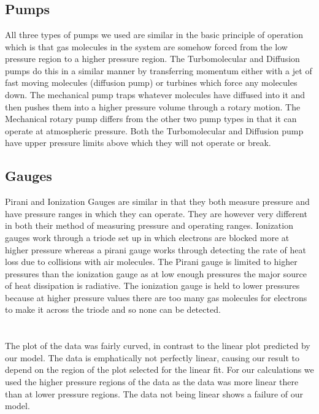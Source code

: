 \documentclass[12pt,a4paper]{article}
\begin{document}
\section{}
\subsection*{Pumps}
All three types of pumps we used are similar in the basic principle of operation which is that gas molecules in the system are somehow forced from the low pressure region to a higher pressure region. The Turbomolecular and Diffusion pumps do this in a similar manner by transferring momentum either with a jet of fast moving molecules (diffusion pump) or turbines which force any molecules down. The mechanical pump traps whatever molecules have diffused into it and then pushes them into a higher pressure volume through a rotary motion. The Mechanical rotary pump differs from the other two pump types in that it can operate at atmospheric pressure. Both the Turbomolecular and Diffusion pump have upper pressure limits above which they will not operate or break.
\subsection*{Gauges}
Pirani and Ionization Gauges are similar in that they both measure pressure and have pressure ranges in which they can operate. They are however very different in both their method of measuring pressure and operating ranges. Ionization gauges work through a triode set up in which electrons are blocked more at higher pressure whereas a pirani gauge works through detecting the rate of heat loss due to collisions with air molecules. The Pirani gauge is limited to higher pressures than the ionization gauge as at low enough pressures the major source of heat dissipation is radiative. The ionization gauge is held to lower pressures because at higher pressure values there are too many gas molecules for electrons to make it across the triode and so none can be detected.
\section{}
The plot of the data was fairly curved, in contrast to the linear plot predicted by our model. The data is emphatically not perfectly linear, causing our result to depend on the region of the plot selected for the linear fit. For our calculations we used the higher pressure regions of the data as the data was more linear there than at lower pressure regions. The data not being linear shows a failure of our model. 
\end{document}
